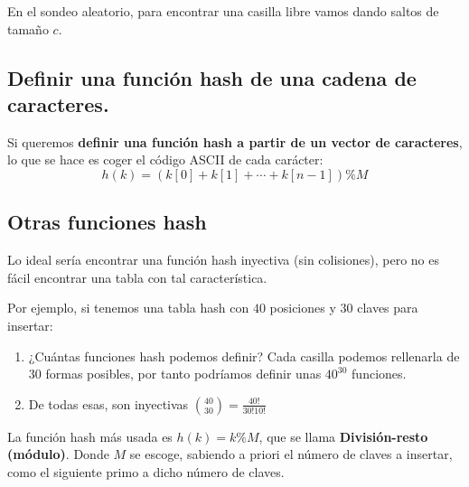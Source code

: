 \documentclass[10pt,a4paper,spanish]{report}
\begin{document}
\noindent
En el sondeo aleatorio, para encontrar una casilla libre vamos dando saltos de tamaño $c$.

\subsection{\textcolor[rgb]{0.3,0.4,0.8}Definir una función hash de una cadena de caracteres.}
\noindent
Si queremos \textbf{definir una función hash a partir de un vector de caracteres}, lo que se hace es coger el código ASCII de cada carácter:
\begin{displaymath}
h(k) = (k[0] + k[1] + \cdots + k[n-1]) \% M
\end{displaymath}

\subsection{\textcolor[rgb]{0.3,0.4,0.8}Otras funciones hash}
\noindent
Lo ideal sería encontrar una función hash inyectiva (sin colisiones), pero no es fácil encontrar una tabla con tal característica.

\noindent
Por ejemplo, si tenemos una tabla hash con $40$ posiciones y $30$ claves para insertar:
\begin{enumerate}[$\heartsuit$]
      \item ¿Cuántas funciones hash podemos definir? Cada casilla podemos rellenarla de $30$ formas posibles, por tanto podríamos definir unas $40^{30}$ funciones.
      \item De todas esas, son inyectivas $\binom{40}{30} = \frac{40!}{30! 10!}$
\end{enumerate}

\noindent
La función hash más usada es $h (k) = k \% M$, que se llama \textbf{\textcolor[rgb]{0.3,0.4,0.8}{División-resto (módulo)}}. Donde $M$ se escoge, sabiendo a priori el número de claves a insertar, como el siguiente primo a dicho número de claves.
\end{document}
